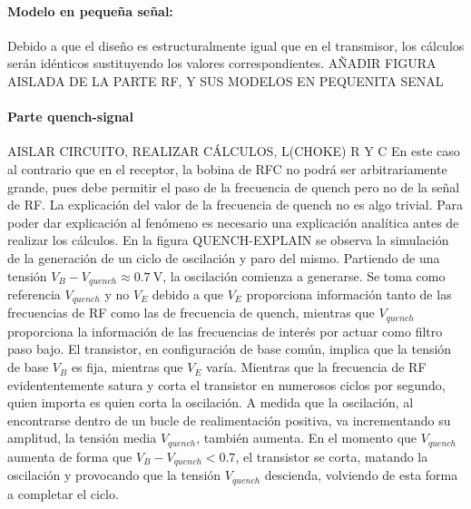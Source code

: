 \paragraph{Modelo en pequeña señal:} Debido a que el diseño es estructuralmente igual que en el transmisor, los cálculos serán idénticos sustituyendo los valores correspondientes.
AÑADIR FIGURA AISLADA DE LA PARTE RF, Y SUS MODELOS EN PEQUENITA SENAL

\paragraph{Parte quench-signal} AISLAR CIRCUITO, REALIZAR C\'ALCULOS, L(CHOKE) R Y C
En este caso al contrario que en el receptor, la bobina de RFC no podrá ser arbitrariamente grande, pues debe permitir el paso de la frecuencia de quench pero no de la señal de RF.
La explicación del valor de la frecuencia de quench no es algo trivial. Para poder dar explicación al fenómeno es necesario una explicación analítica antes de realizar los cálculos.
En la figura QUENCH-EXPLAIN se observa la simulación de la generación de un ciclo de oscilación y paro del mismo. Partiendo de una tensión $V_B - V_{quench} \approx \SI{0.7}{\volt}$, la oscilación comienza a generarse. Se toma como referencia $V_{quench}$ y no $V_E$ debido a que $V_E$ proporciona información tanto de las frecuencias de RF como las de frecuencia de quench, mientras que $V_{quench}$ proporciona la información de las frecuencias de interés por actuar como filtro paso bajo. 
El transistor, en configuración de base común, implica que la tensión de base $V_B$ es fija, mientras que $V_E$ varía. Mientras que la frecuencia de RF evidententemente satura y corta el transistor en numerosos ciclos por segundo, quien importa es quien corta la oscilación. A medida que la oscilación, al encontrarse dentro de un bucle de realimentación positiva, va incrementando su amplitud, la tensión media $V_{quench}$, también aumenta. En el momento que $V_{quench}$ aumenta de forma que $V_B - V_{quench} < 0.7$, el transistor se corta, matando la oscilación y provocando que la tensión $V_{quench}$ descienda, volviendo de esta forma a completar el ciclo.
